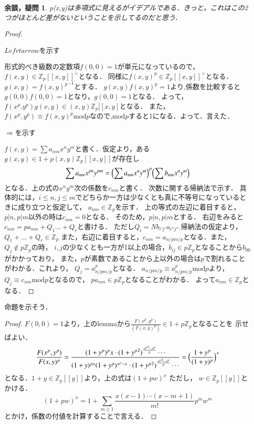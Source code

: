 \documentclass{ujarticle}
\newtheorem*{yodan}{余談，疑問}
\begin{document}
\begin{yodan}
 p(x,y)は多項式に見えるがイデアルである．きっと，これはこの2つがほとんど差がないということを示してるのだと思う．
\end{yodan}
\begin{proof}
\begin{description}
  \item[$Lefrtarrow$を示す]
\end{description}
形式的べき級数の定数項$f(0,0)=1$が単元になっているので，$f(x,y) \in \mathbb{Z}_p[[x,y]]^{\times}$となる．
同様に$f(x,y)^p \in \mathbb{Z}_p[[x,y]]^{\times}$となる．$g(x,y)={f(x,y)^p}^{-1}$とする．
$g(x,y)f(x,y)^p=1$より,係数を比較すると$g(0,0)f(0,0)=1$となり，$g(0,0)=1$となる．
よって，$f(x^p.y^p)g(x,y) \in (x,y)\mathbb{Z}_p[[x,y]$となる．
また，$f(x^p,y^p) \equiv f(x,y)^p \mbox{mod}p$なので,$\mathrm{mod}p$すると1になる．よって．言えた．

\begin{description}
  \item[$\Rightarrow$を示す]
\end{description}
$f(x,y)=\sum a_{nm}x^ny^m$と書く．仮定より，ある$g(x,y)\in 1 + p(x,y)\mathbb{Z}_p[[x,y]]$が存在し
\begin{equation*}
 \sum a_{nm}x^{pn}y^{pm} = \Bigl( \sum a_{nm}x^ny^m \Bigr)^p \Bigl( \sum b_{nm}x^ny^m \Bigr)
\end{equation*}
となる．上の式の$x^ny^m$次の係数を$c_{nm}$と書く．
次数に関する帰納法で示す．
具体的には，$i \le n,j \le m$でどちらか一方は少なくとも真に不等号になっているときに成り立つと仮定して，
$a_{nm} \in \mathbb{Z}_p$を示す．
上の等式の左辺に着目すると，$p|n,p|m$以外の時は$c_{nm}=0$となる．
そのため，$p |n,p|m$とする．
右辺をみると$c_{nm}=pa_{nm}+Q_1 \dots +Q_r$と書ける．
ただし$Q_i=Nb_{i'j'}a_{i''j''}$.帰納法の仮定より，$Q_1 + \dots +Q_r \in \mathbb{Z}_p$
また，右辺に着目すると，$c_{nm}=a_{n/pm/p}$となる．また，$Q_j \notin p\mathbb{Z}_p$の時，
$i,j$の少なくとも一方が1以上の場合，$b_{ij} \in p\mathbb{Z}_p$となることから$b_{00}$がかかっており，
また，$p$が素数であることから上以外の場合は$p$で割れることがわかる．これより，
$Q_j=a_{n/pm/p}^p$となる．
$a_{n/pm/p} \equiv a_{n/pm/p}^p \mbox{mod}p$より，
$Q_j \equiv c_{nm} \mathrm{mod}p$となるので，
$pa_{nm} \in p\mathbb{Z}_p$となることがわかる．
よって$a_{nm} \in \mathbb{Z}_p$となる．
\end{proof}
命題を示そう．
\begin{proof}
$F(0,0)=1$より，上のlemmaから$\frac{F(x^p,y^p)}{(F(x,y)^p)} \in 1 +p \mathbb{Z}_p$となることを
示せばよい．
\begin{equation*}
  \frac{F(x^p,y^p)}{F(x,y)^p} = \frac{(1+y^p)^px \cdot (1+{y^p}^2)^{\frac{{x^p}^2 -x^p}{p}}\cdots}
                                {(1+y)^{px}(1+y^p)^{x^p-x}\cdot (1+{y^p}^2)^{\frac{{x^p}^2-x^p}{p}}\cdots}
                          = \Bigl( \frac{1+y^p}{(1+y)^p}\Bigr)^x
\end{equation*}
となる．$1+y\in \mathbb{Z}_p[[y]]$より，上の式は$(1 +pw)^x$ ただし，
$w \in \mathbb{Z}_p[[y]]$とかける．
\begin{equation*}
 (1+pw)^x = 1 + \sum_{m \ge 1} \frac{x(x-1)\cdots (x-m+1)}{m!}p^mw^m
\end{equation*}
とかけ，係数の付値を計算することで言える．
\end{proof}
\end{document}
